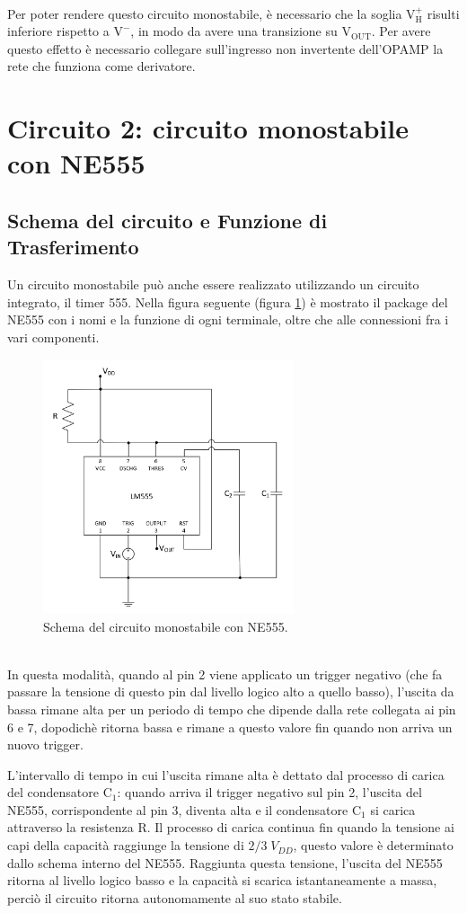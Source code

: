\documentclass{report}
\begin{document}
\\Per poter rendere questo circuito monostabile, è necessario che la soglia $\mathrm{V_H^+}$ risulti inferiore rispetto a $\mathrm{V^-}$, in modo da avere una transizione su $\mathrm{V_{OUT}}$. Per avere questo effetto è necessario collegare sull'ingresso non invertente dell'OPAMP la rete che funziona come derivatore.
\newpage
\section{Circuito 2: circuito monostabile con NE555}
\subsection{Schema del circuito e Funzione di Trasferimento}
Un circuito monostabile può anche essere realizzato utilizzando un circuito integrato, il timer 555. Nella figura seguente (figura \ref{figura:schema2}) è mostrato il package del NE555 con i nomi e la funzione di ogni terminale, oltre che alle connessioni fra i vari componenti.
\begin{figure}[h!]
	\centering
	\includegraphics[height=7.5cm]{immagini/schema2}
	\caption{Schema del circuito monostabile con NE555.}
	\label{figura:schema2}
\end{figure}
\\In questa modalità, quando al pin 2 viene applicato un trigger negativo (che fa passare la tensione di questo pin dal livello logico alto a quello basso), l'uscita da bassa rimane alta per un periodo di tempo che dipende dalla rete collegata ai pin 6 e 7, dopodichè ritorna bassa e rimane a questo valore fin quando non arriva un nuovo trigger.\par
L'intervallo di tempo in cui l'uscita rimane alta è dettato dal processo di carica del condensatore $\mathrm{C_1}$: quando arriva il trigger negativo sul pin 2, l'uscita del NE555, corrispondente al pin 3, diventa alta e il condensatore $\mathrm{C_1}$ si carica attraverso la resistenza $\mathrm{R}$. Il processo di carica continua fin quando la tensione ai capi della capacità raggiunge la tensione di $\displaystyle{2/3\;V_{DD}}$, questo valore è determinato dallo schema interno del NE555. Raggiunta questa tensione, l'uscita del NE555 ritorna al livello logico basso e la capacità si scarica istantaneamente a massa, perciò il circuito ritorna autonomamente al suo stato stabile.
\end{document}
